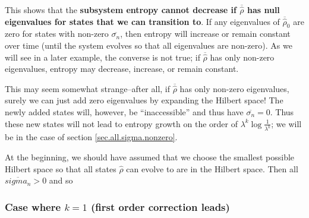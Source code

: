 \documentclass[11pt]{article}
\newcommand{\op}[1]{\hat{#1}}
\theoremstyle{theorem}
\theoremstyle{remark}
\theoremstyle{step}
\theoremstyle{gap}
\begin{document}
This shows that the {\bf subsystem entropy cannot decrease if \(\overline{\op{\rho}}\) has null eigenvalues for states that we can transition to}. If any eigenvalues of \(\overline{\op{\rho}}_0\) are zero for states with non-zero \(\overline{\sigma_n}\), then entropy will increase or remain constant over time (until the system evolves so that all eigenvalues are non-zero). As we will see in a later example, the converse is not true; if \(\overline{\op{\rho}}\) has only non-zero eigenvalues, entropy may decrease, increase, or remain constant.

This may seem somewhat strange--after all, if \(\overline{\op{\rho}}\) has only non-zero eigenvalues, surely we can just add zero eigenvalues by expanding the Hilbert space! The newly added states will, however, be ``inaccessible'' and thus have \(\overline{\sigma_n}=0\). Thus these new states will not lead to entropy growth on the order of \(\lambda^k \log \frac{1}{\lambda^k}\); we will be in the case of section \ref{sec.all.sigma.nonzero}.

At the beginning, we should have assumed that we choose the smallest possible Hilbert space so that all states \(\op{\rho}\) can evolve to are in the Hilbert space. Then all \(\overline{sigma_n} > 0\) and so 

\subsubsection{Case where \(k=1\) (first order correction leads)}
\end{document}

